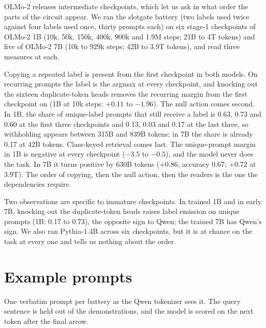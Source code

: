 \documentclass{article}
\begin{document}
OLMo-2 releases intermediate checkpoints, which let us ask in what order the parts of the circuit appear. We ran the slotgate battery (two labels used twice against four labels used once, thirty prompts each) on six stage-1 checkpoints of OLMo-2 1B (10k, 50k, 150k, 400k, 900k and 1.9M steps; 21B to 4T tokens) and five of OLMo-2 7B (10k to 929k steps; 42B to 3.9T tokens), and read three measures at each.

Copying a repeated label is present from the first checkpoint in both models. On recurring prompts the label is the argmax at every checkpoint, and knocking out the sixteen duplicate-token heads removes the recurring margin from the first checkpoint on (1B at 10k steps: $+0.11$ to $-1.96$). The null action comes second. In 1B, the share of unique-label prompts that still receive a label is 0.63, 0.73 and 0.60 at the first three checkpoints and 0.13, 0.03 and 0.17 at the last three, so withholding appears between 315B and 839B tokens; in 7B the share is already 0.17 at 42B tokens. Class-keyed retrieval comes last. The unique-prompt margin in 1B is negative at every checkpoint ($-3.5$ to $-0.5$), and the model never does the task. In 7B it turns positive by 630B tokens ($+0.86$, accuracy 0.67; $+0.72$ at 3.9T). The order of copying, then the null action, then the readers is the one the dependencies require.

Two observations are specific to immature checkpoints. In trained 1B and in early 7B, knocking out the duplicate-token heads raises label emission on unique prompts (1B: 0.17 to 0.73), the opposite sign to Qwen; the trained 7B has Qwen's sign. We also ran Pythia-1.4B across six checkpoints, but it is at chance on the task at every one and tells us nothing about the order.

\section{Example prompts}\label{app:prompts}
One verbatim prompt per battery as the Qwen tokenizer sees it. The query sentence is held out of the demonstrations, and the model is scored on the next token after the final arrow.
\end{document}
